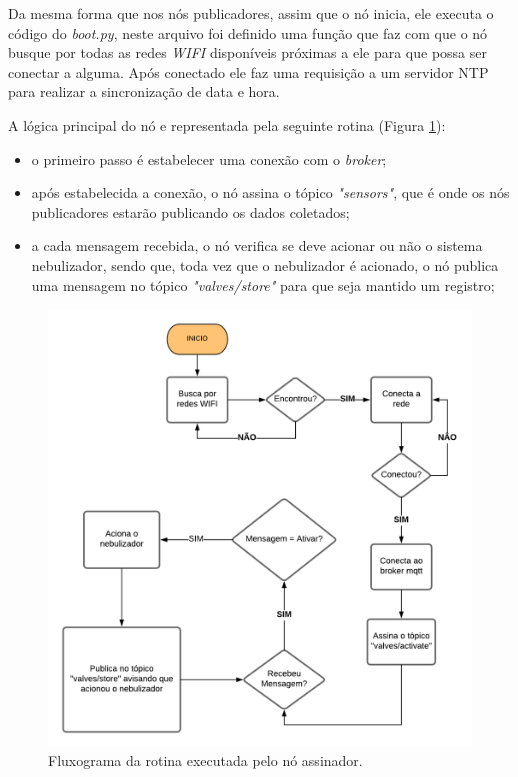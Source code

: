 Da mesma forma que nos nós publicadores, assim que o nó inicia, ele executa o código do \textit{boot.py}, neste arquivo foi definido uma função que faz com que o nó busque por todas as redes \textit{WIFI} disponíveis próximas a ele para que possa ser conectar a alguma. Após conectado ele faz uma requisição a um servidor NTP para realizar a sincronização de data e hora.

A lógica principal do nó e representada pela seguinte rotina (Figura \ref{fig:fluxograma-assinador}):

\begin{itemize}
    \item o primeiro passo é estabelecer uma conexão com o \textit{broker};
    \item após estabelecida a conexão, o nó assina o tópico \textit{"sensors"}, que é onde os nós publicadores estarão publicando os dados coletados;
    \item a cada mensagem recebida, o nó verifica se deve acionar ou não o sistema nebulizador, sendo que, toda vez que o nebulizador é acionado, o nó publica uma mensagem no tópico \textit{"valves/store"} para que seja mantido um registro;
\end{itemize}

\begin{figure}[H]
    \centering
    \includegraphics[scale=0.4]{04-figuras/fluxograma-subscriber.png}
    \caption{Fluxograma da rotina executada pelo nó assinador.}
    \vspace{-\baselineskip}
    \label{fig:fluxograma-assinador}
\end{figure}

